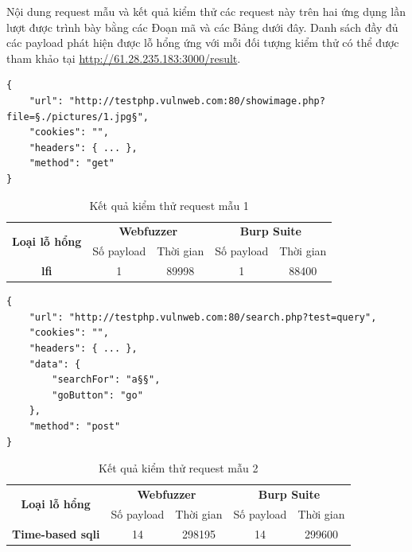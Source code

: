 \FloatBarrier
Nội dung request mẫu và kết quả kiểm thử các request này trên hai ứng dụng lần lượt được trình bày bằng các Đoạn mã và các Bảng dưới đây. Danh sách đầy đủ các payload phát hiện được lỗ hổng ứng với mỗi đối tượng kiểm thử có thể được tham khảo tại \href{http://61.28.235.183:3000/result}{http://61.28.235.183:3000/result}.
\begin{lstlisting}[style=ES6, label={lst:base-request-1}, caption={Request mẫu 1 có lỗ hổng \acrshort{lfi}}]
{
    "url": "http://testphp.vulnweb.com:80/showimage.php?file=§./pictures/1.jpg§",
    "cookies": "",
    "headers": { ... },
    "method": "get"
}
\end{lstlisting}
\FloatBarrier
\begin{table}[ht]
    \centering
    \caption{Kết quả kiểm thử request mẫu 1}
    \label{tab:testing-result-1}
    \begin{tabular}[ht]{ccccc}
        \toprule[1pt]\midrule[0.3pt]
            \multirow{2}{*}{\textbf{Loại lỗ hổng}}&\multicolumn{2}{c}{\textbf{Webfuzzer}}&\multicolumn{2}{c}{\textbf{Burp Suite}}\\
            \cmidrule(lr){2-3}\cmidrule(lr){4-5}{}&Số payload&Thời gian&Số payload&Thời gian\\
        \midrule[0.3pt]
            \textbf{\acrshort{lfi}}&1&89998&1&88400\\
        \midrule[0.3pt]\bottomrule[1pt]
    \end{tabular}
\end{table}
\FloatBarrier
\begin{lstlisting}[style=ES6, label={lst:base-request-2}, caption={Request mẫu 2 có lỗ hổng time-based \acrshort{sqli}}]
{
    "url": "http://testphp.vulnweb.com:80/search.php?test=query",
    "cookies": "",
    "headers": { ... },
    "data": {
        "searchFor": "a§§",
        "goButton": "go"
    },
    "method": "post"
}
\end{lstlisting}
\FloatBarrier
\begin{table}[ht]
    \centering
    \caption{Kết quả kiểm thử request mẫu 2}
    \label{tab:testing-result-2}
    \begin{tabular}[ht]{ccccc}
        \toprule[1pt]\midrule[0.3pt]
            \multirow{2}{*}{\textbf{Loại lỗ hổng}}&\multicolumn{2}{c}{\textbf{Webfuzzer}}&\multicolumn{2}{c}{\textbf{Burp Suite}}\\
            \cmidrule(lr){2-3}\cmidrule(lr){4-5}{}&Số payload&Thời gian&Số payload&Thời gian\\
        \midrule[0.3pt]
            \textbf{Time-based \acrshort{sqli}}&14&298195&14&299600\\
        \midrule[0.3pt]\bottomrule[1pt]
    \end{tabular}
\end{table}
